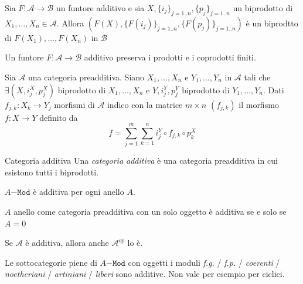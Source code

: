 \begin{remark}{}
    Sia \(F : \mathcal{A} \to \mathcal{B}\) un funtore additivo e sia \(X, \{i_{j}\}_{j = 1. .n}, \{p_{j}\} _{j = 1. .n}  \) un biprodotto di \(X_{1}, \dots, X_{n} \in \mathcal{A}\). Allora 
    \({(F{(X)}, \{F{(i_{j})}\}_{j=1. .n}, \{F{(p_{j})}\} _{j=1. .n}  )}\) è un
    biprodtto di \(F{(X_{1})}, \dots, F{(X_{n})}\) in \(\mathcal{B}\) 
\end{remark}
\begin{corollary}{}
    Un funtore \(F: \mathcal{A} \to \mathcal{B}\) additivo preserva i prodotti e
    i coprodotti finiti.
\end{corollary}

\begin{note}
    Sia \(\mathcal{A}\) una categoria preadditiva. Siano \(X_{1}, \dots, X_{n}\) e \(Y_{1},\dots, Y_{n}\) in \(\mathcal{A}\) tali che \(\exists {(X, i_j^{X}, p_j^{X})}\) biprodotto di \(X_{1}, \dots, X_{n}\) 
    e \(Y, i_j^{Y}, p_j^{Y}\) biprodotto di \(Y_{1}, \dots, Y_{n}\).
    Dati \(f_{j,k}  : X_k\to Y_j \) morfismi di \(\mathcal{A}\) indico con la
    matrice \(m \times  n\) \({(f_{j,k} )}\) il morfismo \(f: X\to Y\)
    definito da
    \[
      f = \sum_{j=1}^{m} \sum_{k=1}^{n} i_j^{Y} \circ f_{j, k} \circ p_k^{X}
    \]
\end{note}

\begin{definition}{Categoria additiva}
    Una \emph{categoria additiva} è una categoria preadditiva in cui esistono
    tutti i biprodotti.
\end{definition}

\begin{example}{}
    \(A\mathtt{-Mod}\) è additiva per ogni anello \(A\).
\end{example}
\begin{example}{}
    \(A\) anello come categoria preadditiva con un solo oggetto è additiva se e solo se
    \(A=0\) 
\end{example}

\begin{remark}{}
    Se \(\mathcal{A}\) è additiva, allora anche \(\mathcal{A}^{op}\) lo è.
\end{remark}

\begin{example}{}
    Le sottocategorie piene di \(A\mathtt{-Mod}\) con oggetti i moduli
    \emph{f.g.} / \emph{f.p.} / \emph{coerenti} / \emph{noetheriani} /
    \emph{artiniani} / \emph{liberi} sono additive. Non vale per esempio per
    ciclici.
\end{example}

